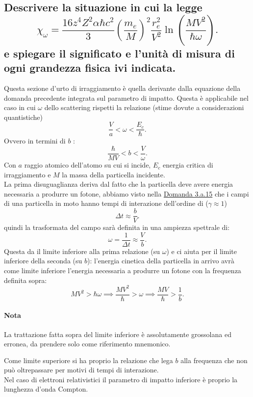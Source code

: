 \subsection[]{Descrivere la situazione in cui la legge
	\[
		\chi_{\omega}=\frac{16 z^4 Z^2 \alpha \hbar c^2}{3} \left( \frac{m_e}{M} \right)^2 \frac{r_e^2}{V^2} \ln\left( \frac{MV^2}{\hbar \omega} \right) 
	.\] 
e spiegare il significato e l'unità di misura di ogni grandezza fisica ivi indicata.
}\label{sec:4.a.14}
Questa sezione d'urto di irraggiamento è quella derivante dalla equazione della domanda precedente integrata sul parametro di impatto. Questa è applicabile nel caso in cui $\omega$ dello scattering rispetti la relazione (stime dovute a considerazioni quantistiche) \[
	\frac{V}{a}< \omega < \frac{E_{c}}{\hbar}
.\] 
Ovvero in termini di $b$ :
\[
	\frac{\hbar}{M V} < b < \frac{V}{\omega}
.\] 
Con $a$ raggio atomico dell'atomo su cui si incide, $E_{c}$ energia critica di irraggiamento e $M$ la massa della particella incidente.\\
La prima disuguaglianza deriva dal fatto che la particella deve avere energia necessaria a produrre un fotone, abbiamo visto nella \hyperref[sec:3.a.15]{Domanda 3.a.15} che i campi di una particella in moto hanno tempi di interazione dell'ordine di ($\gamma \approx 1$)\[
	\Delta t \approx \frac{b}{V} 
.\] 
quindi la trasformata del campo sarà definita in una ampiezza spettrale di: \[
	\omega = \frac{1}{\Delta t} \approx \frac{V}{b}
.\] 
Questa da il limite inferiore alla prima relazione (su $\omega$) e ci aiuta per il limite inferiore della seconda (su $b$): l'energia cinetica della particella in arrivo avrà come limite inferiore l'energia necessaria a produrre un fotone con la frequenza definita sopra: \[
	MV^2>\hbar \omega \implies \frac{MV^2}{\hbar}>\omega \implies \frac{MV}{\hbar} > \frac{1}{b}
.\] 
\paragraph{Nota} La trattazione fatta sopra del limite inferiore è assolutamente grossolana ed erronea, da prendere solo come riferimento mnemonico.

Come limite superiore si ha proprio la relazione che lega $b$ alla frequenza che non può oltrepassare per motivi di tempi di interazione.\\
Nel caso di elettroni relativistici il parametro di impatto inferiore è proprio la lunghezza d'onda Compton.

